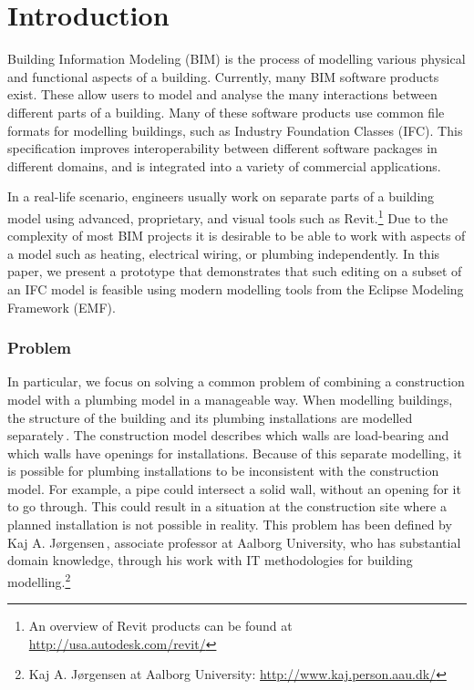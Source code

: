 

\setcounter{page}{1}
\section{Introduction}
Building Information Modeling (BIM) is the process of modelling various physical and functional aspects of a building. Currently, many BIM software products exist. These allow users to model and analyse the many interactions between different parts of a building. Many of these software products use common file formats for modelling buildings, such as Industry Foundation Classes (IFC). This specification improves interoperability between different software packages in different domains, and is integrated into a variety of commercial applications.

In a real-life scenario, engineers usually work on separate parts of a building model using advanced, proprietary, and visual tools such as Revit.\footnote{An overview of Revit products can be found at \url{http://usa.autodesk.com/revit/}} Due to the complexity of most BIM projects it is desirable to be able to work with aspects of a model such as heating, electrical wiring, or plumbing independently. In this paper, we present a prototype that demonstrates that such editing on a subset of an IFC model is feasible using modern modelling tools from the Eclipse Modeling Framework (EMF).

\subsubsection{Problem}
In particular, we focus on solving a common problem of combining a construction model with a plumbing model in a manageable way. When modelling buildings, the structure of the building and its plumbing installations are modelled separately\,\cite[pp. 19--20]{jorgensen10}. The construction model describes which walls are load-bearing and which walls have openings for installations. Because of this separate modelling, it is possible for plumbing installations to be inconsistent with the construction model. For example, a pipe could intersect a solid wall, without an opening for it to go through. This could result in a situation at the construction site where a planned installation is not possible in reality. This problem has been defined by Kaj A. Jørgensen\,\cite{jorgensen10}, associate professor at Aalborg University, who has substantial domain knowledge, through his work with IT methodologies for building modelling.\footnote{Kaj A. Jørgensen at Aalborg University: \url{http://www.kaj.person.aau.dk/}}

